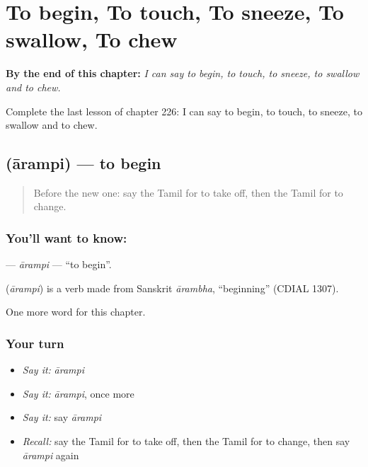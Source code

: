 
\chapter{To begin, To touch, To sneeze, To swallow, To chew}
\label{ch:ta-to-begin-to-touch-to-sneeze-to-swallow-to-chew}

\begin{chapteropening}
\textbf{By the end of this chapter:} \emph{I can say to begin, to touch, to sneeze, to swallow and to chew.}

Complete the last lesson of chapter 226: I can say to begin, to touch, to sneeze, to swallow and to chew.
\end{chapteropening}

\section[\texorpdfstring{\ta{ஆரம்பி} (ārampi)}{ஆரம்பி (ārampi)}]{ (ārampi) — to begin}

\label{lesson:TA-C226-arampi}



\begin{quote}
Before the new one: say the Tamil for to take off, then the Tamil for to change.
\end{quote}

\subsection*{You'll want to know: }
\textbf{} — \emph{ārampi} — \textquotedblleft{}to begin\textquotedblright{}.

\begin{cousinweb}
\textbf{} (\emph{ārampi}) is a verb made from Sanskrit \emph{ārambha}, \textquotedblleft{}beginning\textquotedblright{} (CDIAL 1307).
\end{cousinweb}

\begin{grammarlens}[title={What you've built}]
One more word for this chapter.
\end{grammarlens}

\subsection*{Your turn}
\begin{itemize}
\raggedright
  \item \emph{Say it:} \emph{ārampi}
  \item \emph{Say it:} \emph{ārampi}, once more
  \item \emph{Say it:} say \emph{ārampi}
  \item \emph{Recall:} say the Tamil for to take off, then the Tamil for to change, then say \emph{ārampi} again
\end{itemize}

